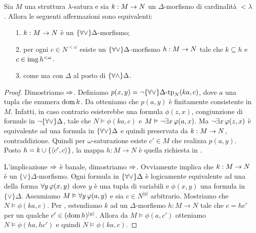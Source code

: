 \begin{lemma}\label{lem_ADelta_estensione}
Sia $M$ una struttura $\lambda$-satura e sia $k:M\rightarrow N$ un $\Delta$-morfismo di cardinalit\`a $<\lambda$. Allora le seguenti affermazioni sono equivalenti:
\begin{itemize}
\item[1.] $k:M\rightarrow N$ \`e un $\{\forall\vee\}\Delta$-morfismo;
\item[2.] per ogni $c\in N^{<\omega}$ esiste un $\{\forall\vee\}\Delta$-morfismo $h:M\rightarrow N$ tale che $k\subseteq h$ e $c\in\mathop{\rm img} h^{<\omega}$.
\item[3.] come   ma con $\Delta$ al posto di $\{\forall\wedge\}\Delta$.
\end{itemize}
\end{lemma}

\begin{proof}
Dimostriamo $\Rightarrow$. Definiamo $p(x,y)=\neg\{\forall\vee\}\Delta\mbox{-}\textrm{tp}_N (ka,c)$, dove $a$ una tupla che enumera $\mathop{\rm dom} k$. Da  otteniamo che $p(a,y)$ \`e finitamente consistente in $M$. Infatti, in caso contrario esisterebbe una formula $\phi(z,x)$, congiunzione di formule in $\neg\{\forall\vee\}\Delta$, tale che $N\models\phi(ka,c)$ e $M\vDash\neg\exists x\,\varphi(a,x)$. Ma $\neg\exists x\,\varphi(z,x)$ \`e equivalente ad una formula in $\{\forall\vee\}\Delta$ e quindi preservata da $k:M\rightarrow N$, contraddizione. Quindi per $\omega$-saturazione esiste $c'\in M$ che realizza $p(a,y)$.  Posto $h=k\cup\{\langle c',c\rangle\}$, la mappa $h:M\to N$ \`e quella richiesta in .

L'implicazione $\Rightarrow$ \`e banale, dimostriamo $\Rightarrow$.  Ovviamente  implica che $k:M\rightarrow N$ \`e un $\{\vee\}\Delta$-morfismo. Ogni formula in $\{\forall\vee\}\Delta$ \`e logicamente equivalente ad una della forma $\forall y\,\varphi (x,y)$ dove $y$ \`e una tupla di variabili e $\phi(x,y)$ una formula in $\{\vee\}\Delta$. Assumiamo $M\vDash\forall y\,\varphi(a,y)$ e sia $c\in N^{|y|}$ arbitrario. Mostriamo che $N\models\phi(ka,c)$. Per , estendiamo $k$ ad un $\Delta$-morfismo $h:M\to N$ tale che $c=hc'$ per un qualche $c'\in(\mathop{\rm dom} h)^{|y|}$. Allora da $M\models\phi(a,c')$ otteniamo $N\models\phi(ha,hc')$ e quindi $N\models\phi(ka,c)$.
\end{proof}


